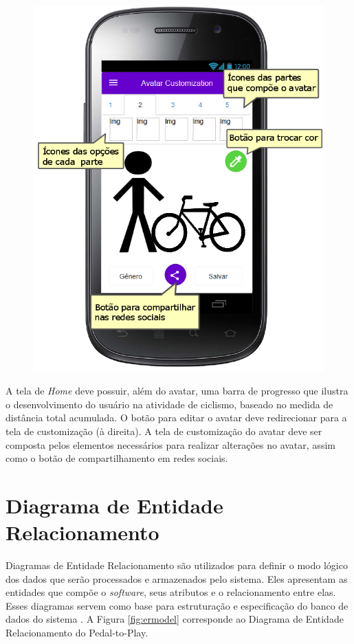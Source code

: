 \begin{figure}[h]
\begin{minipage}{.5\textwidth}
  \centerline{\includegraphics[width=.9\linewidth]{figuras/Customizacao.png}}
  \label{fig:avatarProto}
\end{minipage}
\end{figure}

A tela de \textit{Home} deve possuir, além do avatar, uma barra de progresso que ilustra o desenvolvimento do usuário na atividade de ciclismo, baseado no medida de distância total acumulada. O botão para editar o avatar deve redirecionar para a tela de customização (à direita). A tela de customização do avatar deve ser composta pelos elementos necessários para realizar alterações no avatar, assim como o botão de compartilhamento em redes sociais.

\section{Diagrama de Entidade Relacionamento}
Diagramas de Entidade Relacionamento são utilizados para definir o modo lógico dos dados que serão processados e armazenados pelo sistema. Eles apresentam as entidades que compõe o \textit{software}, seus atributos e o relacionamento entre elas. Esses diagramas servem como base para estruturação e especificação do banco de dados do sistema \cite{sommerville2003engenharia}. A Figura \ref{fig:ermodel} corresponde ao Diagrama de Entidade Relacionamento do Pedal-to-Play.

